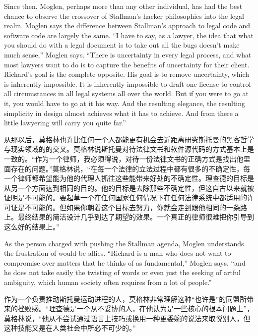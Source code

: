 \ifdefined\eng
Since then, Moglen, perhaps more than any other individual, has had the best chance to observe the crossover of Stallman's hacker philosophies into the legal realm. Moglen says the difference between Stallman's approach to legal code and software code are largely the same. ``I have to say, as a lawyer, the idea that what you should do with a legal document is to take out all the bugs doesn't make much sense,'' Moglen says. ``There is uncertainty in every legal process, and what most lawyers want to do is to capture the benefits of uncertainty for their client. Richard's goal is the complete opposite. His goal is to remove uncertainty, which is inherently impossible. It is inherently impossible to draft one license to control all circumstances in all legal systems all over the world. But if you were to go at it, you would have to go at it his way. And the resulting elegance, the resulting simplicity in design almost achieves what it has to achieve. And from there a little lawyering will carry you quite far.''
\fi

\ifdefined\chs
从那以后，莫格林也许比任何一个人都能更有机会去近距离研究斯托曼的黑客哲学与现实领域的的交叉。莫格林说斯托曼对待法律文书和软件源代码的方式基本上是一致的。``作为一个律师，我必须得说，对待一份法律文书的正确方式是找出他里面存在的问题。''莫格林说，``在每一个法律的立法过程中都有很多的不确定性，每一个律师都希望能为他的代理人抓往这些能带来好处的不确定性。理查德的目标是从另一个方面达到相同的目的。他的目标是去除那些不确定性，但这自古以来就被证明是不可能的。要起草一个在任何国家任何情况下在任何法律系统中都适用的许可证是不可能的。但如果你朝着这个目标去努力，你就会走到跟他相同的一条路上。最终结果的简洁设计几乎到达了期望的效果。一个真正的律师很难把你引导到这么好的结果上。''
\fi

\ifdefined\eng
As the person charged with pushing the Stallman agenda, Moglen understands the frustration of would-be allies. ``Richard is a man who does not want to compromise over matters that he thinks of as fundamental,'' Moglen says, ``and he does not take easily the twisting of words or even just the seeking of artful ambiguity, which human society often requires from a lot of people.''
\fi

\ifdefined\chs
作为一个负责推动斯托曼运动进程的人，莫格林非常理解这种``也许是''的同盟所带来的挫败感。``理查德是一个从不妥协的人，在他认为是一些核心的根本问题上''，莫格林说，``他从不尝试通过语言上技巧或换用一种更委婉的说法来取悦别人，但这种技能又是在人类社会中所必不可少的。''
\fi


